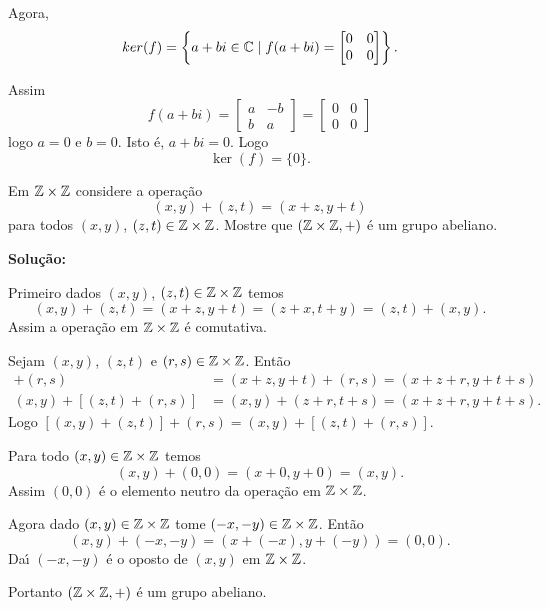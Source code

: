 \documentclass[12pt]{exam}
\begin{document}
Agora,
\[
	ker(f) = \left\{a + bi \in \mathbb{C} \mid f(a + bi) = \begin{bmatrix}
		0 & 0\\
		0 & 0
	\end{bmatrix}\right\}.
\]

Assim
\[
	f(a + bi) = \begin{bmatrix}
		a & -b\\
		b & a
	\end{bmatrix} = \begin{bmatrix}
		0 & 0\\
		0 & 0
	\end{bmatrix}
\]
logo $a = 0$ e $b = 0$. Isto \'e, $a + bi = 0$. Logo 
\[
	\ker(f) = \{0\}.
\]

\vspace{1cm}

\questao Em $\mathbb{Z} \times\mathbb{Z}$ considere a opera\c{c}\~ao
\[
	(x, y) + (z, t) = (x + z, y + t)
\]
para todos $(x,y)$, $(z,t) \in \mathbb{Z}\times\mathbb{Z}$. Mostre que $(\mathbb{Z}\times\mathbb{Z}, +)$ \'e um grupo abeliano.

\noindent\textbf{Solu\c{c}\~ao:}

Primeiro dados $(x,y)$, $(z,t) \in \mathbb{Z}\times\mathbb{Z}$ temos
\[
	(x,y) + (z,t) = (x+z,y+t) = (z+x,t+y) = (z,t) + (x,y).
\]
Assim a opera\c{c}\~ao em $\mathbb{Z}\times\mathbb{Z}$ \'e comutativa.

Sejam $(x,y)$, $(z,t)$ e $(r,s) \in \mathbb{Z}\times\mathbb{Z}$. Ent\~ao
\begin{align*}
	[(x,y) + (z,t)] + (r,s) &= (x + z, y+t) + (r,s) = (x+z+r,y+t+s)\\
	(x,y) + [(z,t)+(r,s)] &= (x,y) + (z+r,t+s) = (x+z+r,y+t+s).
\end{align*}
Logo $[(x,y)+(z,t)] + (r,s) = (x,y) + [(z,t) + (r,s)]$.

Para todo $(x,y) \in \mathbb{Z}\times\mathbb{Z}$ temos
\[
	(x,y) + (0,0) = (x+0,y+0) = (x,y).
\]
Assim $(0,0)$ \'e o elemento neutro da opera\c{c}\~ao em $\mathbb{Z}\times\mathbb{Z}$.

Agora dado $(x,y) \in \mathbb{Z}\times\mathbb{Z}$ tome $(-x,-y) \in \mathbb{Z}\times\mathbb{Z}$. Ent\~ao
\[
	(x,y) + (-x,-y) = (x+(-x),y+(-y)) = (0,0).
\]
Da{\'\i} $(-x,-y)$ \'e o oposto de $(x,y)$ em $\mathbb{Z}\times\mathbb{Z}$.

Portanto $(\mathbb{Z}\times\mathbb{Z},+)$ \'e um grupo abeliano.
\end{document}
